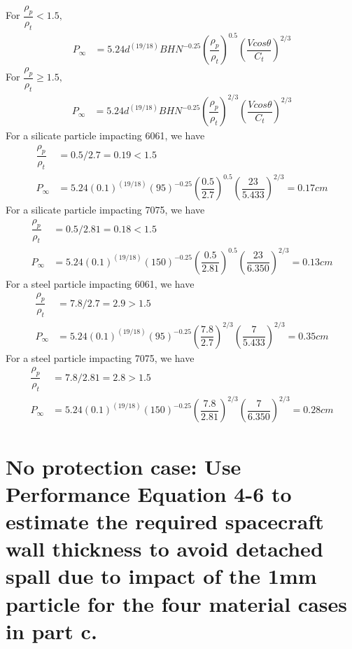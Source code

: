 \documentclass[onecolumn,10pt]{jhwhw}
\begin{document}
\noindent For $\dfrac{\rho_p}{\rho_t} < 1.5,$
\begin{align*}
P_{\infty} &= 5.24 d^{(19/18)} BHN^{-0.25} \left(\dfrac{\rho_p}{\rho_t}\right)^{0.5} \left(\dfrac{V cos \theta}{C_t}\right)^{2/3}
\end{align*}
For $\dfrac{\rho_p}{\rho_t} \geq 1.5,$
\begin{align*}
P_{\infty} &= 5.24 d^{(19/18)} BHN^{-0.25} \left(\dfrac{\rho_p}{\rho_t}\right)^{2/3} \left(\dfrac{V cos \theta}{C_t}\right)^{2/3}
\end{align*}
\noindent For a silicate particle impacting 6061, we have
\begin{align*}
\dfrac{\rho_p}{\rho_t} &= 0.5/2.7 = 0.19 < 1.5 \\
P_{\infty} &= 5.24 (0.1)^{(19/18)} (95)^{-0.25} \left(\dfrac{0.5}{2.7}\right)^{0.5} \left(\dfrac{23}{5.433}\right)^{2/3} = 0.17 cm
\end{align*}
\noindent For a silicate particle impacting 7075, we have
\begin{align*}
\dfrac{\rho_p}{\rho_t} &= 0.5/2.81 = 0.18 < 1.5 \\
P_{\infty} &= 5.24 (0.1)^{(19/18)} (150)^{-0.25} \left(\dfrac{0.5}{2.81}\right)^{0.5} \left(\dfrac{23}{6.350}\right)^{2/3} = 0.13 cm
\end{align*}
\noindent For a steel particle impacting 6061, we have
\begin{align*}
\dfrac{\rho_p}{\rho_t} &= 7.8/2.7 = 2.9 > 1.5 \\
P_{\infty} &= 5.24 (0.1)^{(19/18)} (95)^{-0.25} \left(\dfrac{7.8}{2.7}\right)^{2/3} \left(\dfrac{7}{5.433}\right)^{2/3} = 0.35 cm
\end{align*}
\noindent For a steel particle impacting 7075, we have
\begin{align*}
\dfrac{\rho_p}{\rho_t} &= 7.8/2.81 = 2.8 > 1.5 \\
P_{\infty} &= 5.24 (0.1)^{(19/18)} (150)^{-0.25} \left(\dfrac{7.8}{2.81}\right)^{2/3} \left(\dfrac{7}{6.350}\right)^{2/3} = 0.28 cm
\end{align*}

\part{No protection case: Use Performance Equation 4-6 to estimate the required spacecraft wall thickness to avoid detached spall due to impact of the 1mm particle for the four material cases in part c.}
\end{document}
